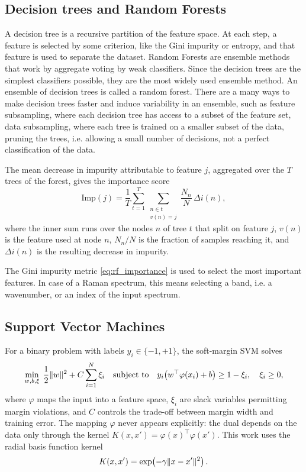 \subsection*{Decision trees and Random Forests}

A decision tree is a recursive partition of the feature space. At each step, a feature is selected by some criterion, like the Gini impurity or entropy, and that feature is used to separate the dataset. Random Forests are ensemble methods that work by aggregate voting by weak classifiers. Since the decision trees are the simplest classifiers possible, they are the most widely used ensemble method. An ensemble of decision trees is called a random forest. There are a many ways to make decision trees faster and induce variability in an ensemble, such as feature subsampling, where each decision tree has access to a subset of the feature set, data subsampling, where each tree is trained on a smaller subset of the data, pruning the trees, i.e. allowing a small number of decisions, not a perfect classification of the data.


The mean decrease in impurity attributable to feature $j$, aggregated over the $T$ trees of the
forest, gives the importance score
\begin{equation}
\text{Imp}(j) = \frac{1}{T} \sum_{t=1}^{T} \sum_{\substack{n \in t \\ v(n) = j}}
                 \frac{N_n}{N} \, \Delta i(n),
\label{eq:rf_importance}
\end{equation}
where the inner sum runs over the nodes $n$ of tree $t$ that split on feature $j$, $v(n)$ is
the feature used at node $n$, $N_n/N$ is the fraction of samples reaching it, and $\Delta i(n)$
is the resulting decrease in impurity.

The Gini impurity metric \eqref{eq:rf_importance} is used to select the most important features. In case of a Raman spectrum, this means selecting a band, i.e. a wavenumber, or an index of the input spectrum.

\subsection*{Support Vector Machines}

For a binary problem with labels $y_i \in \{-1, +1\}$, the soft-margin SVM solves
\begin{equation}
\min_{w, b, \xi} \; \frac{1}{2}\lVert w\rVert^2 + C \sum_{i=1}^{N} \xi_i
\quad \text{subject to} \quad
y_i\big(w^\top \varphi(x_i) + b\big) \ge 1 - \xi_i, \quad \xi_i \ge 0,
\label{eq:svm_primal}
\end{equation}
where $\varphi$ maps the input into a feature space, $\xi_i$ are slack variables permitting
margin violations, and $C$ controls the trade-off between margin width and training error.
The mapping $\varphi$ never appears explicitly: the dual depends on the data only through the
kernel $K(x, x') = \varphi(x)^\top \varphi(x')$. This work uses the radial basis function
kernel
\begin{equation}
K(x, x') = \exp\!\left(-\gamma \lVert x - x'\rVert^2\right).
\label{eq:rbf_kernel}
\end{equation}

